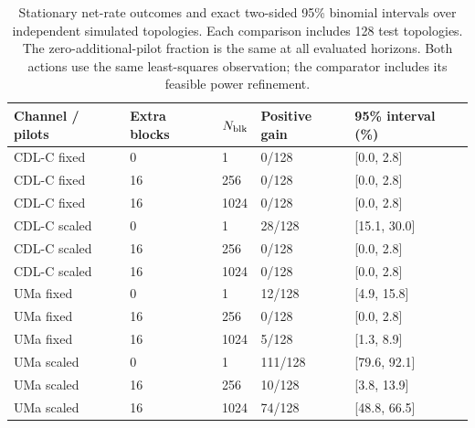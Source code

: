 \begin{table}[htbp]\centering\small
\setlength{\tabcolsep}{4pt}
\caption{Stationary net-rate outcomes and exact two-sided 95\% binomial intervals over independent simulated topologies. Each comparison includes 128 test topologies. The zero-additional-pilot fraction is the same at all evaluated horizons. Both actions use the same least-squares observation; the comparator includes its feasible power refinement.}\label{supp:table7}
\begin{tabular}{lllll}\toprule
Channel / pilots & Extra blocks & $N_{\rm blk}$ & Positive gain & 95\% interval (\%)\\
\midrule
CDL-C fixed & 0 & 1 & 0/128 & [0.0, 2.8]\\
CDL-C fixed & 16 & 256 & 0/128 & [0.0, 2.8]\\
CDL-C fixed & 16 & 1024 & 0/128 & [0.0, 2.8]\\
CDL-C scaled & 0 & 1 & 28/128 & [15.1, 30.0]\\
CDL-C scaled & 16 & 256 & 0/128 & [0.0, 2.8]\\
CDL-C scaled & 16 & 1024 & 0/128 & [0.0, 2.8]\\
UMa fixed & 0 & 1 & 12/128 & [4.9, 15.8]\\
UMa fixed & 16 & 256 & 0/128 & [0.0, 2.8]\\
UMa fixed & 16 & 1024 & 5/128 & [1.3, 8.9]\\
UMa scaled & 0 & 1 & 111/128 & [79.6, 92.1]\\
UMa scaled & 16 & 256 & 10/128 & [3.8, 13.9]\\
UMa scaled & 16 & 1024 & 74/128 & [48.8, 66.5]\\
\bottomrule\end{tabular}
\end{table}

